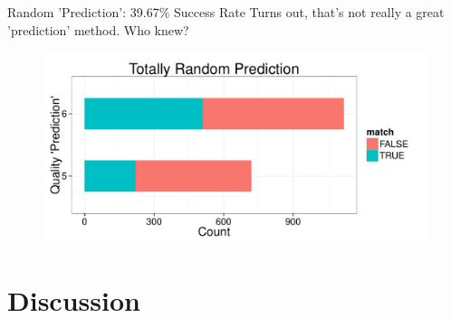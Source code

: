 \documentclass{beamer}
\begin{document}
\begin{frame}{Random 'Prediction': 39.67\% Success Rate}
	Turns out, that's not really a great 'prediction' method. Who knew?
	\begin{figure}
		\centering
		\includegraphics[width=\textwidth]{../images/RandomPrediction.pdf}
	\end{figure}
\end{frame}


\section{Discussion}
\begin{frame}{}


\end{frame}
\end{document}
